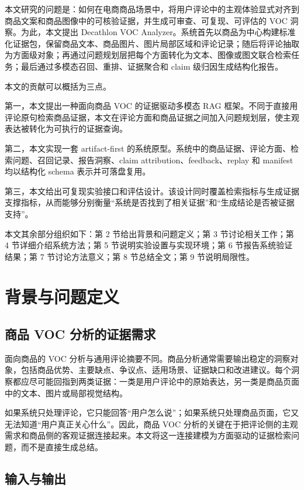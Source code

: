 \documentclass[11pt]{article}
\begin{document}
本文研究的问题是：如何在电商商品场景中，将用户评论中的主观体验显式对齐到商品文案和商品图像中的可核验证据，并生成可审查、可复现、可评估的 VOC 洞察。为此，本文提出 Decathlon VOC Analyzer。系统首先以商品为中心构建标准化证据包，保留商品文本、商品图片、图片局部区域和评论记录；随后将评论抽取为方面级对象；再通过问题规划层把每个方面转化为文本、图像或图文联合检索任务；最后通过多模态召回、重排、证据聚合和 claim 级归因生成结构化报告。

本文的贡献可以概括为三点。

第一，本文提出一种面向商品 VOC 的证据驱动多模态 RAG 框架。不同于直接用评论原句检索商品证据，本文在评论方面和商品证据之间加入问题规划层，使主观表达被转化为可执行的证据查询。

第二，本文实现一套 artifact-first 的系统原型。系统中的商品证据、评论方面、检索问题、召回记录、报告洞察、claim attribution、feedback、replay 和 manifest 均以结构化 schema 表示并可落盘复用。

第三，本文给出可复现实验接口和评估设计。该设计同时覆盖检索指标与生成证据支撑指标，从而能够分别衡量``系统是否找到了相关证据''和``生成结论是否被证据支持''。

本文其余部分组织如下：第 2 节给出背景和问题定义；第 3 节讨论相关工作；第 4 节详细介绍系统方法；第 5 节说明实验设置与实现环境；第 6 节报告系统验证结果；第 7 节讨论方法意义；第 8 节总结全文；第 9 节说明局限性。

\section{背景与问题定义}
\subsection{商品 VOC 分析的证据需求}

面向商品的 VOC 分析与通用评论摘要不同。商品分析通常需要输出稳定的洞察对象，包括商品优势、主要缺点、争议点、适用场景、证据缺口和改进建议。每个洞察都应尽可能回指到两类证据：一类是用户评论中的原始表达，另一类是商品页面中的文本、图片或局部视觉结构。

如果系统只处理评论，它只能回答``用户怎么说''；如果系统只处理商品页面，它又无法知道``用户真正关心什么''。因此，商品 VOC 分析的关键在于把评论侧的主观需求和商品侧的客观证据连接起来。本文将这一连接建模为方面驱动的证据检索问题，而不是直接生成总结。

\subsection{输入与输出}
\end{document}
